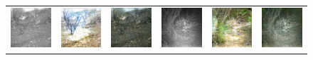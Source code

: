 \begin{figure}[htp!]
\begin{tabularx}{\textwidth}{Y Y Y !{\space} Y Y Y}
        \includegraphics{gfx/conditional-diffusion-sampling-caltech-qual/nir_585c042f-23d2-11e8-a6a3-ec086b02610b.jpg} & \includegraphics{gfx/conditional-diffusion-sampling-caltech-qual/cyclegan_585c042f-23d2-11e8-a6a3-ec086b02610b_fake.png} & \includegraphics{gfx/conditional-diffusion-sampling-caltech-qual/diffusion_585c042f-23d2-11e8-a6a3-ec086b02610b.png} & \includegraphics{gfx/conditional-diffusion-sampling-caltech-qual/nir_585c05fe-23d2-11e8-a6a3-ec086b02610b.jpg} & \includegraphics{gfx/conditional-diffusion-sampling-caltech-qual/cyclegan_585c05fe-23d2-11e8-a6a3-ec086b02610b_fake.png} & \includegraphics{gfx/conditional-diffusion-sampling-caltech-qual/diffusion_585c05fe-23d2-11e8-a6a3-ec086b02610b.png} \\

\end{tabularx}
\end{figure}
